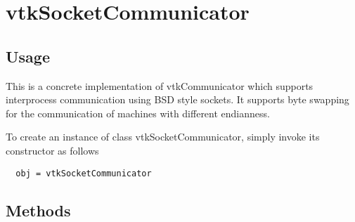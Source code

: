 \section{vtkSocketCommunicator}

\subsection{Usage}

 This is a concrete implementation of vtkCommunicator which supports
 interprocess communication using BSD style sockets. 
 It supports byte swapping for the communication of  machines 
 with different endianness.

To create an instance of class vtkSocketCommunicator, simply
invoke its constructor as follows
\begin{verbatim}
  obj = vtkSocketCommunicator
\end{verbatim}
\subsection{Methods}

